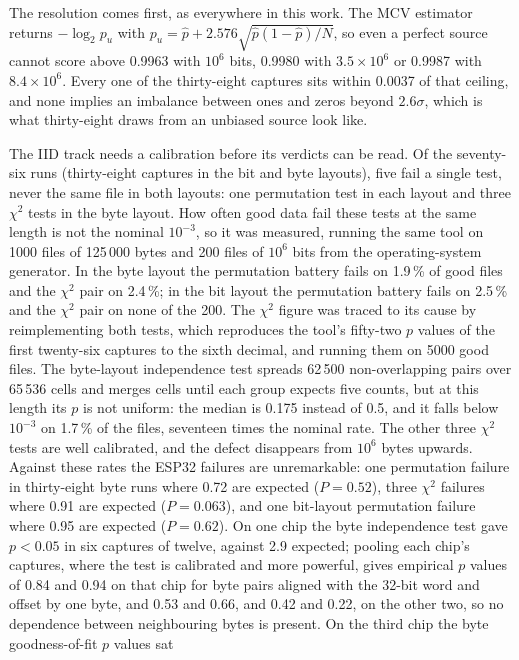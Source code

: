 The resolution comes first, as everywhere in this work. The MCV estimator
returns $-\log_2 p_u$ with $p_u = \hat p + 2.576\sqrt{\hat p(1-\hat p)/N}$,
so even a perfect source cannot score above 0.9963 with $10^6$ bits,
0.9980 with $3.5\times10^6$ or 0.9987 with $8.4\times10^6$. Every one of
the thirty-eight captures sits within 0.0037 of that ceiling, and none
implies an imbalance between ones and zeros beyond $2.6\sigma$, which is
what thirty-eight draws from an unbiased source look like.

The IID track needs a calibration before its verdicts can be read. Of the
seventy-six runs (thirty-eight captures in the bit and byte layouts), five
fail a single test, never the same file in both layouts: one permutation
test in each layout and three $\chi^2$ tests in the byte layout. How often
good data fail these tests at the same length is not the nominal
$10^{-3}$, so it was measured, running the same tool on 1000 files of
125\,000 bytes and 200 files of $10^6$ bits from the operating-system
generator. In the byte layout the permutation battery fails on 1.9\,\% of
good files and the $\chi^2$ pair on 2.4\,\%; in the bit layout
the permutation battery fails on 2.5\,\% and the $\chi^2$ pair on none of the 200. The $\chi^2$ figure was traced to its cause by reimplementing
both tests, which reproduces the tool's fifty-two $p$ values of the first
twenty-six captures to the sixth
decimal, and running them on 5000 good files. The byte-layout independence
test spreads 62\,500 non-overlapping pairs over 65\,536 cells and merges
cells until each group expects five counts, but at this length its $p$ is
not uniform: the median is 0.175 instead of 0.5, and it falls below
$10^{-3}$ on 1.7\,\% of the files, seventeen times the nominal rate. The
other three $\chi^2$ tests are well calibrated, and the defect disappears
from $10^6$ bytes upwards. Against these rates the ESP32 failures are
unremarkable: one permutation failure in thirty-eight byte runs where 0.72
are expected ($P = 0.52$), three $\chi^2$ failures where 0.91 are expected
($P = 0.063$), and one bit-layout permutation failure where 0.95 are expected
($P = 0.62$). On one chip the byte independence test gave
$p < 0.05$ in six captures of twelve, against 2.9 expected; pooling each
chip's captures, where the test is calibrated and more powerful, gives
empirical $p$ values of 0.84 and 0.94 on that chip for byte pairs aligned
with the 32-bit word and offset by one byte, and 0.53 and 0.66, and 0.42
and 0.22, on the other two, so no dependence between neighbouring bytes
is present. On the third chip the byte goodness-of-fit $p$ values sat
